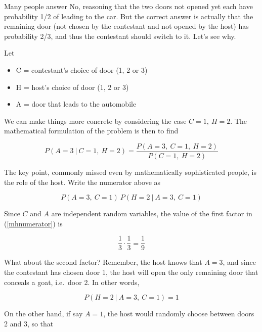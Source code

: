 Many people answer No, reasoning that the two doors not opened yet each
have probability 1/2 of leading to the car.  But the correct answer is
actually that the remaining door (not chosen by the contestant and not
opened by the host) has probability 2/3, and thus the contestant should
switch to it.  Let's see why.

Let

\begin{itemize}

\item C = contestant's choice of door (1, 2 or 3)
\item H = host's choice of door (1, 2 or 3)
\item A = door that leads to the automobile
 
\end{itemize}

We can make things more concrete by considering the case $C = 1, ~ H = 2$.
The mathematical formulation of the problem is then to find

\begin{equation}
\label{montyhall1}
P(A = 3 ~|~ C = 1, ~ H = 2) =
\frac
{P(A = 3, ~ C = 1, ~ H = 2)}
{P(C = 1, ~ H = 2)}
\end{equation}

The key point, commonly missed even by mathematically sophisticated
people, is the role of the host.  Write the numerator above as

\begin{equation}
\label{mhnumerator}
P(A = 3, ~ C = 1) ~ P(H = 2 ~|~ A = 3, ~ C = 1)
\end{equation}

Since $C$ and $A$ are independent random variables, the value of the
first factor in (\ref{mhnumerator}) is 

\begin{equation}
\frac{1}{3} \cdot
\frac{1}{3} = \frac{1}{9}
\end{equation}

What about the second factor?  Remember, the host knows that $A = 3$,
and since the contestant has chosen door 1, the host will open the only
remaining door that conceals a goat, i.e.\ door 2.  In other words,

\begin{equation}
P(H = 2 ~|~ A = 3, ~ C = 1) = 1
\end{equation}

On the other hand, if say $A = 1$, the host would randomly choose
between doors 2 and 3, so that

